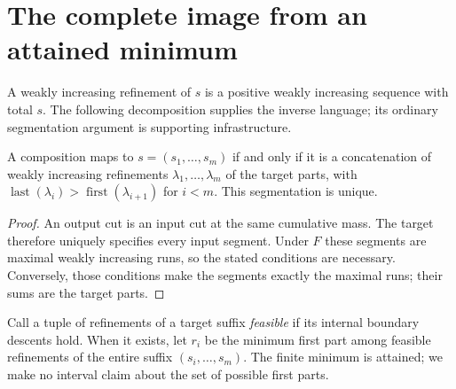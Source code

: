 \section{The complete image from an attained minimum}\label{sec:image}
A weakly increasing refinement of $s$ is a positive weakly increasing
sequence with total $s$. The following decomposition supplies the inverse
language; its ordinary segmentation argument is supporting infrastructure.

\begin{lemma}\label{lem:refinement}
A composition maps to $s=(s_1,\ldots,s_m)$ if and only if it is a
concatenation of weakly increasing refinements $\lambda_1,\ldots,\lambda_m$
of the target parts, with
$\operatorname{last}(\lambda_i)>\operatorname{first}(\lambda_{i+1})$
for $i<m$. This segmentation is unique.
\end{lemma}
\begin{proof}
An output cut is an input cut at the same cumulative mass. The target
therefore uniquely specifies every input segment. Under $F$ these segments
are maximal weakly increasing runs, so the stated conditions are necessary.
Conversely, those conditions make the segments exactly the maximal runs;
their sums are the target parts.
\end{proof}

Call a tuple of refinements of a target suffix \emph{feasible} if its
internal boundary descents hold. When it exists, let $r_i$ be the minimum
first part among feasible refinements of the entire suffix
$(s_i,\ldots,s_m)$. The finite minimum is attained; we make no interval
claim about the set of possible first parts.

